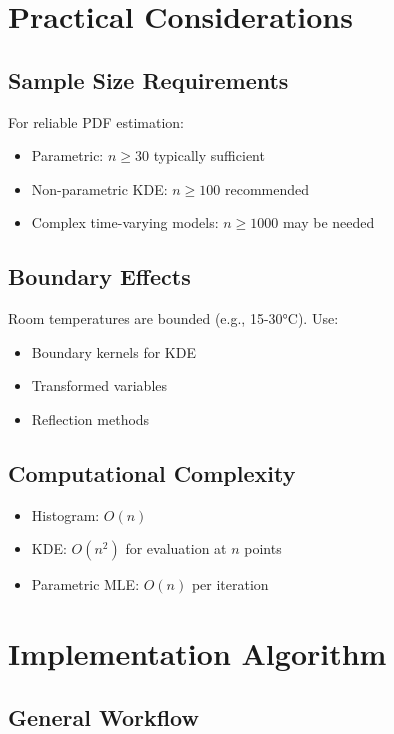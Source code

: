 \documentclass[12pt, xcolor=dvipsnames,svgnames,x11names]{article}
\begin{document}
\section{Practical Considerations}

\subsection{Sample Size Requirements}

For reliable PDF estimation:
\begin{itemize}
\item Parametric: $n \geq 30$ typically sufficient
\item Non-parametric KDE: $n \geq 100$ recommended
\item Complex time-varying models: $n \geq 1000$ may be needed
\end{itemize}

\subsection{Boundary Effects}

Room temperatures are bounded (e.g., 15-30°C). Use:
\begin{itemize}
\item Boundary kernels for KDE
\item Transformed variables
\item Reflection methods
\end{itemize}

\subsection{Computational Complexity}
\begin{itemize}
\item Histogram: $O(n)$
\item KDE: $O(n^2)$ for evaluation at $n$ points
\item Parametric MLE: $O(n)$ per iteration
\end{itemize}

\section{Implementation Algorithm}

\subsection{General Workflow}
\end{document}
